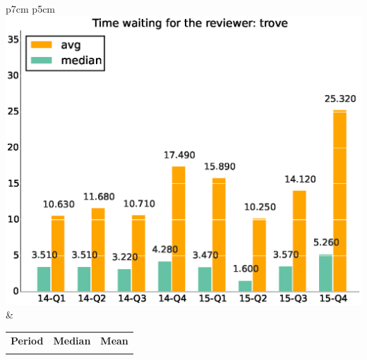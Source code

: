 \documentclass[a4wide,11pt]{article}
\begin{document}
\begin{tabular}{p{7cm} p{5cm}}
    \vspace{0pt} 
    \includegraphics[scale=.35]{figs/waiting4reviewer_avgtrove.eps}
    & 
    \vspace{0pt}
    \begin{tabular}{l|r|r|}%
    \bfseries Period & \bfseries Median & \bfseries Mean %
    \csvreader[head to column names]{data/timewaiting4reviewer_mediantrove.csv}{}%
    {\\ & \mediantime & \meantime}
    \end{tabular}
\end{tabular}
\end{document}
